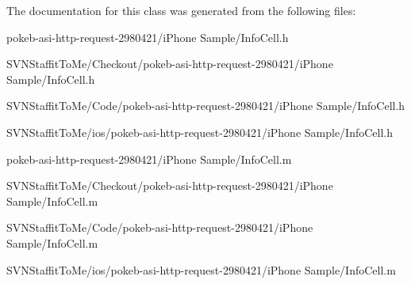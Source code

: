 \-The documentation for this class was generated from the following files\-:\begin{DoxyCompactItemize}
\item 
pokeb-\/asi-\/http-\/request-\/2980421/i\-Phone Sample/\-Info\-Cell.\-h\item 
\-S\-V\-N\-Staffit\-To\-Me/\-Checkout/pokeb-\/asi-\/http-\/request-\/2980421/i\-Phone Sample/\-Info\-Cell.\-h\item 
\-S\-V\-N\-Staffit\-To\-Me/\-Code/pokeb-\/asi-\/http-\/request-\/2980421/i\-Phone Sample/\-Info\-Cell.\-h\item 
\-S\-V\-N\-Staffit\-To\-Me/ios/pokeb-\/asi-\/http-\/request-\/2980421/i\-Phone Sample/\-Info\-Cell.\-h\item 
pokeb-\/asi-\/http-\/request-\/2980421/i\-Phone Sample/\-Info\-Cell.\-m\item 
\-S\-V\-N\-Staffit\-To\-Me/\-Checkout/pokeb-\/asi-\/http-\/request-\/2980421/i\-Phone Sample/\-Info\-Cell.\-m\item 
\-S\-V\-N\-Staffit\-To\-Me/\-Code/pokeb-\/asi-\/http-\/request-\/2980421/i\-Phone Sample/\-Info\-Cell.\-m\item 
\-S\-V\-N\-Staffit\-To\-Me/ios/pokeb-\/asi-\/http-\/request-\/2980421/i\-Phone Sample/\-Info\-Cell.\-m\end{DoxyCompactItemize}
